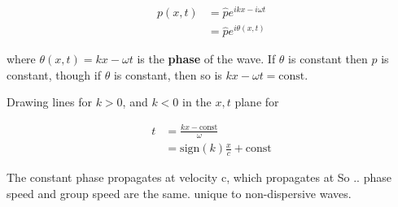 \begin{align*}
  p(x,t) &= \hat p e^{ikx-i \omega t} \\
         &= \hat p e^{i \theta(x,t)}
\end{align*}

where $\theta(x,t) = kx- \omega t$ is the \textbf{phase} of the wave. If
$\theta$ is constant then $p$ is constant, though if $\theta$ is constant, then
so is $kx- \omega t = \text{const}$.


Drawing lines for $k>0$, and $k<0$ in the $x,t$ plane for

\begin{align*}
  t &= \frac{kx -\text{const}}{ \omega} \\
    &= \text{sign}(k) \frac{x}{c} + \text{const}
\end{align*}


The constant phase propagates at velocity c, which propagates at  So .. phase
speed and group speed are the same. unique to non-dispersive waves.
